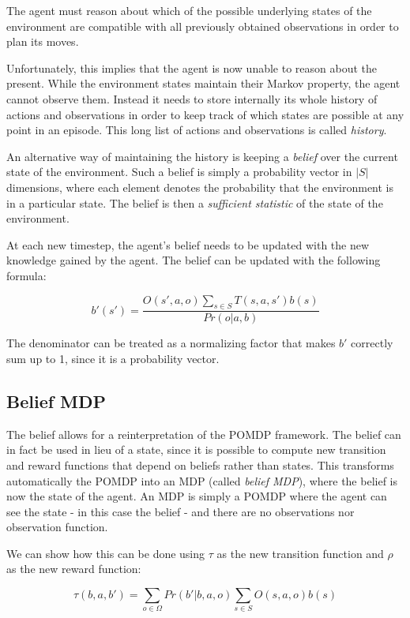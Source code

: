 The agent must reason about which of the possible underlying states of the environment are
compatible with all previously obtained observations in order to plan its moves.

Unfortunately, this implies that the agent is now unable to reason about the present. While the
environment states maintain their Markov property, the agent cannot observe them. Instead it needs
to store internally its whole history of actions and observations in order to keep track of which
states are possible at any point in an episode. This long list of actions and observations is called
\textit{history}.

An alternative way of maintaining the history is keeping a \textit{belief} over the current state of
the environment. Such a belief is simply a probability vector in $|S|$ dimensions, where each
element denotes the probability that the environment is in a particular state. The belief is then a
\textit{sufficient statistic} of the state of the environment.

At each new timestep, the agent's belief needs to be updated with the new knowledge gained by the
agent. The belief can be updated with the following formula:

\[ b'(s') = \frac{O(s', a, o)\sum_{s\in S}T(s,a,s')b(s)}{Pr(o|a,b)} \]

The denominator can be treated as a normalizing factor that makes $b'$ correctly sum up to 1, since
it is a probability vector.

\subsection{Belief MDP}

The belief allows for a reinterpretation of the POMDP framework. The belief can in fact be used in
lieu of a state, since it is possible to compute new transition and reward functions that depend on
beliefs rather than states. This transforms automatically the POMDP into an MDP (called
\textit{belief MDP}), where the belief is now the state of the agent. An MDP  is simply a POMDP where
the agent can see the state - in this case the belief - and there are no observations nor
observation function.

We can show how this can be done using $\tau$ as the new transition function and $\rho$ as the new
reward function:

\[ \tau(b,a,b') = \sum_{o\in \Omega} Pr(b' | b, a, o) \sum_{s\in S} O(s,a,o) b(s) \]

